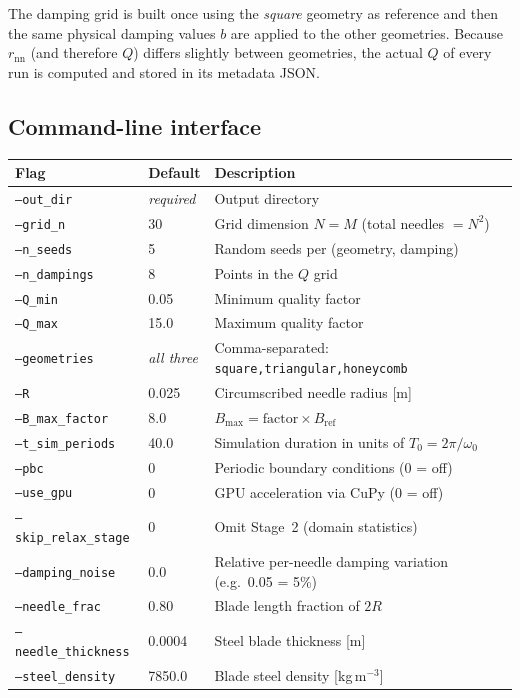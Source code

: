 \documentclass[11pt,a4paper]{article}
\newcommand{\param}[1]{\texttt{--#1}}
\begin{document}
The damping grid is built once using the \textit{square} geometry as reference
and then the same physical damping values $b$ are applied to the other
geometries.  Because $r_{\mathrm{nn}}$ (and therefore $Q$) differs slightly
between geometries, the actual $Q$ of every run is computed and stored in its
metadata JSON.

\subsection{Command-line interface}

\begin{longtable}{p{4.6cm}p{2.0cm}p{8.0cm}}
\toprule
Flag & Default & Description \\
\midrule
\endhead
\param{out\_dir} & \textit{required} & Output directory \\
\param{grid\_n} & 30 & Grid dimension $N = M$ (total needles $= N^2$) \\
\param{n\_seeds} & 5 & Random seeds per (geometry, damping) \\
\param{n\_dampings} & 8 & Points in the $Q$ grid \\
\param{Q\_min} & 0.05 & Minimum quality factor \\
\param{Q\_max} & 15.0 & Maximum quality factor \\
\param{geometries} & \textit{all three} & Comma-separated: \texttt{square,triangular,honeycomb} \\
\param{R} & 0.025 & Circumscribed needle radius [m] \\
\param{B\_max\_factor} & 8.0 & $B_{\max} = \text{factor} \times B_{\mathrm{ref}}$ \\
\param{t\_sim\_periods} & 40.0 & Simulation duration in units of $T_0 = 2\pi/\omega_0$ \\
\param{pbc} & 0 & Periodic boundary conditions (0 = off) \\
\param{use\_gpu} & 0 & GPU acceleration via CuPy (0 = off) \\
\param{skip\_relax\_stage} & 0 & Omit Stage~2 (domain statistics) \\
\param{damping\_noise} & 0.0 & Relative per-needle damping variation (e.g.\ 0.05 = 5\%) \\
\param{needle\_frac} & 0.80 & Blade length fraction of $2R$ \\
\param{needle\_thickness} & 0.0004 & Steel blade thickness [m] \\
\param{steel\_density} & 7850.0 & Blade steel density [kg\,m$^{-3}$] \\

\end{longtable}
\end{document}
